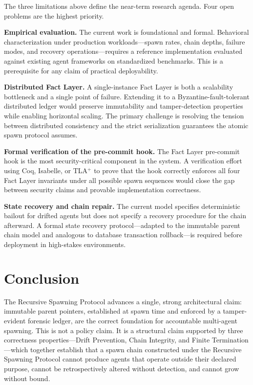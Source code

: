 The three limitations above define the near-term research agenda. Four open problems are the highest priority.

\textbf{Empirical evaluation.} The current work is foundational and formal. Behavioral characterization under production workloads---spawn rates, chain depths, failure modes, and recovery operations---requires a reference implementation evaluated against existing agent frameworks on standardized benchmarks. This is a prerequisite for any claim of practical deployability.

\textbf{Distributed Fact Layer.} A single-instance Fact Layer is both a scalability bottleneck and a single point of failure. Extending it to a Byzantine-fault-tolerant distributed ledger would preserve immutability and tamper-detection properties while enabling horizontal scaling. The primary challenge is resolving the tension between distributed consistency and the strict serialization guarantees the atomic spawn protocol assumes.

\textbf{Formal verification of the pre-commit hook.} The Fact Layer pre-commit hook is the most security-critical component in the system. A verification effort using Coq, Isabelle, or TLA$^+$ to prove that the hook correctly enforces all four Fact Layer invariants under all possible spawn sequences would close the gap between security claims and provable implementation correctness.

\textbf{State recovery and chain repair.} The current model specifies deterministic bailout for drifted agents but does not specify a recovery procedure for the chain afterward. A formal state recovery protocol---adapted to the immutable parent chain model and analogous to database transaction rollback---is required before deployment in high-stakes environments.

\section{Conclusion}
\label{sec:conclusion}

The Recursive Spawning Protocol advances a single, strong architectural claim: immutable parent pointers, established at spawn time and enforced by a tamper-evident forensic ledger, are the correct foundation for accountable multi-agent spawning. This is not a policy claim. It is a structural claim supported by three correctness properties---Drift Prevention, Chain Integrity, and Finite Termination---which together establish that a spawn chain constructed under the Recursive Spawning Protocol cannot produce agents that operate outside their declared purpose, cannot be retrospectively altered without detection, and cannot grow without bound.

